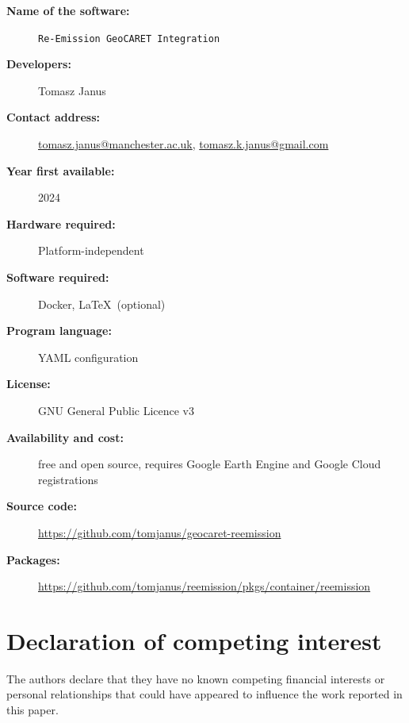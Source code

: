 \documentclass[final,1p,times]{elsarticle}
\begin{document}
\vspace{3pt}

\begin{description}
  \item[\textbf{Name of the software:}] \texttt{Re-Emission GeoCARET Integration}
  \item[\textbf{Developers:}] Tomasz Janus
  \item[\textbf{Contact address:}] \href{mailto:tomasz.janus@manchester.ac.uk}{tomasz.janus@manchester.ac.uk}, \href{mailto:tomasz.k.janus@gmail.com}{tomasz.k.janus@gmail.com}
  \item[\textbf{Year first available:}] 2024
  \item[\textbf{Hardware required:}] Platform-independent
  \item[\textbf{Software required:}] Docker, \LaTeX \, (optional)
  \item[\textbf{Program language:}] YAML configuration
  \item[\textbf{License:}] GNU General Public Licence v3
  \item[\textbf{Availability and cost:}] free and open source, requires Google Earth Engine and Google Cloud registrations
  \item[\textbf{Source code:}] \href{https://github.com/tomjanus/geocaret-reemission}{https://github.com/tomjanus/geocaret-reemission}
  \item[\textbf{Packages:}] \href{https://github.com/tomjanus/reemission/pkgs/container/reemission}{https://github.com/tomjanus/reemission/pkgs/container/reemission}
\end{description}

\section{Declaration of competing interest}
The authors declare that they have no known competing financial interests or personal relationships that could have appeared to influence the work reported in this paper.
\end{document}
